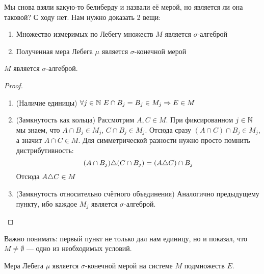 \begin{note}
	Мы снова взяли какую-то белиберду и назвали её мерой, но является ли она таковой? С ходу нет. Нам нужно доказать 2 вещи:
	\begin{enumerate}
		\item Множество измеримых по Лебегу множеств $M$ является $\sigma$-алгеброй
		
		\item Полученная мера Лебега $\mu$ является $\sigma$-конечной мерой
	\end{enumerate}
\end{note}

\begin{theorem}
	$M$ является $\sigma$-алгеброй.
\end{theorem}

\begin{proof}~
	\begin{enumerate}
		\item (Наличие единицы) $\forall j \in \mathbb{N}\ E \cap B_j = B_j \in M_j \Rightarrow E \in M$
		
		\item (Замкнутость как кольца) Рассмотрим $A, C \in M$. При фиксированном $j \in \mathbb{N}$ мы знаем, что $A \cap B_j \in M_j$, $C \cap B_j \in M_j$. Отсюда сразу $(A \cap C) \cap B_j \in M_j$, а значит $A \cap C \in M$. Для симметрической разности нужно просто помнить дистрибутивность:
		\[
			(A \cap B_j) \triangle (C \cap B_j) = (A \triangle C) \cap B_j
		\]
		Отсюда $A \triangle C \in M$
		
		\item (Замкнутость относительно счётного объединения) Аналогично предыдущему пункту, ибо каждое $M_j$ является $\sigma$-алгеброй.
	\end{enumerate}
\end{proof}

\begin{note}
	Важно понимать: первый пункт не только дал нам единицу, но и показал, что $M \neq \emptyset$ --- одно из необходимых условий.
\end{note}

\begin{theorem}
	Мера Лебега $\mu$ является $\sigma$-конечной мерой на системе $M$ подмножеств $E$.
\end{theorem}

